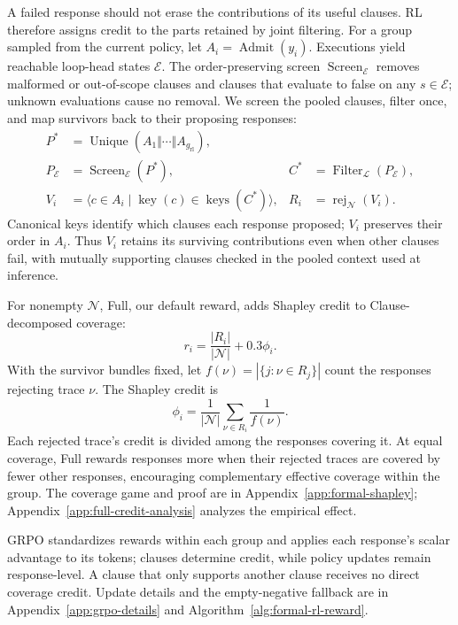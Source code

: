 A failed response should not erase the contributions of its useful clauses.
RL therefore assigns credit to the parts retained by joint filtering.
For a group sampled from the current policy, let
\(A_i=\operatorname{Admit}(y_i)\).  Executions yield reachable loop-head
states \(\mathcal E\).  The order-preserving screen
\(\operatorname{Screen}_{\mathcal E}\) removes malformed or out-of-scope
clauses and clauses that evaluate to false on any \(s\in\mathcal E\);
unknown evaluations cause no removal.  We screen the pooled clauses, filter
once, and map survivors back to their proposing responses:
\begin{align}
  P^*&=\operatorname{Unique}\!\left(A_1\Vert\cdots\Vert A_{g_{\mathrm{rl}}}\right),
  &&\nonumber\\
  P_{\mathcal E}&=\operatorname{Screen}_{\mathcal E}(P^*),
  &C^*&=\operatorname{Filter}_{\mathcal L}(P_{\mathcal E}),\nonumber\\
  V_i&=\langle c\in A_i\mid\operatorname{key}(c)\in\operatorname{keys}(C^*)\rangle,
  &R_i&=\operatorname{rej}_{\mathcal N}(V_i).
  \label{eq:method-credit-pool}
\end{align}
Canonical keys identify which clauses each response proposed;
\(V_i\) preserves their order in \(A_i\). Thus \(V_i\)
retains its surviving contributions even when other clauses fail, with
mutually supporting clauses checked in the pooled context used at inference.

For nonempty \(\mathcal N\), Full, our default reward, adds Shapley credit
to Clause-decomposed coverage:
\begin{equation}
\label{eq:generation-reward}
  r_i=\frac{|R_i|}{|\mathcal N|}+0.3\phi_i.
\end{equation}
With the survivor bundles fixed, let \(f(\nu)=|\{j:\nu\in R_j\}|\) count
the responses rejecting trace \(\nu\).  The Shapley credit is
\begin{equation}
  \phi_i=\frac{1}{|\mathcal N|}\sum_{\nu\in R_i}\frac{1}{f(\nu)}.
  \label{eq:method-shapley}
\end{equation}
Each rejected trace's credit is divided among the responses covering it.
At equal coverage, Full rewards responses more when their rejected traces
are covered by fewer other responses, encouraging complementary effective
coverage within the group.
The coverage game and proof are in Appendix~\ref{app:formal-shapley};
Appendix~\ref{app:full-credit-analysis} analyzes the empirical effect.

GRPO standardizes rewards within each group and applies each response's
scalar advantage to its tokens; clauses determine credit, while policy
updates remain response-level.  A clause that only supports another clause
receives no direct coverage credit.  Update details and the empty-negative
fallback are in Appendix~\ref{app:grpo-details} and
Algorithm~\ref{alg:formal-rl-reward}.
